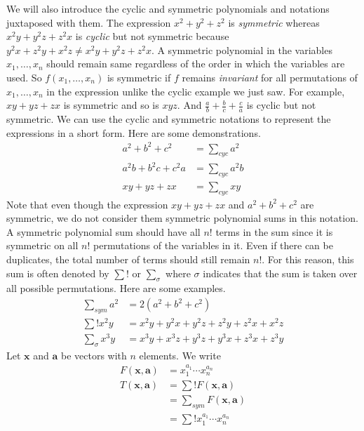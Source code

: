 \documentclass{subfile}
\begin{document}
	We will also introduce the cyclic and symmetric polynomials and notations juxtaposed with them. The expression $x^{2}+y^{2}+z^{2}$ is \textit{symmetric} whereas $x^{2}y+y^{2}z+z^{2}x$ is \textit{cyclic} but not symmetric because $y^{2}x+z^{2}y+x^{2}z\neq x^{2}y+y^{2}z+z^{2}x$. A symmetric polynomial in the variables $x_{1},\ldots,x_{n}$ should remain same regardless of the order in which the variables are used. So $f(x_{1},\ldots,x_{n})$ is symmetric if $f$ remains \textit{invariant} for all permutations of $x_{1},\ldots,x_{n}$ in the expression unlike the cyclic example we just saw. For example, $xy+yz+zx$ is symmetric and so is $xyz$. And $\frac{a}{b}+\frac{b}{c}+\frac{c}{a}$ is cyclic but not symmetric. We can use the cyclic and symmetric notations to represent the expressions in a short form. Here are some demonstrations.
		\begin{align*}
			a^{2}+b^{2}+c^{2}
				& = \sum_{cyc}a^{2}\\
			a^{2}b+b^{2}c+c^{2}a
				& = \sum_{cyc}a^{2}b\\
			xy+yz+zx
				& = \sum_{cyc}xy
		\end{align*}
	Note that even though the expression $xy+yz+zx$ and $a^{2}+b^{2}+c^{2}$ are symmetric, we do not consider them symmetric polynomial sums in this notation. A symmetric polynomial sum should have all $n!$ terms in the sum since it is symmetric on all $n!$ permutations of the variables in it. Even if there can be duplicates, the total number of terms should still remain $n!$. For this reason, this sum is often denoted by $\sum{!}$ or $\sum_{\sigma}$ where $\sigma$ indicates that the sum is taken over all possible permutations. Here are some examples.
		\begin{align*}
			\sum_{sym}a^{2}
				& = 2(a^{2}+b^{2}+c^{2})\\
			\sum{!} x^{2}y
				& = x^{2}y+y^{2}x+y^{2}z+z^{2}y+z^{2}x+x^{2}z\\
			\sum_{\sigma}x^{3}y
				& = x^{3}y+x^{3}z+y^{3}z+y^{3}x+z^{3}x+z^{3}y
		\end{align*}
	Let $\mathbf{x}$ and $\mathbf{a}$ be vectors with $n$ elements. We write
		\begin{align*}
			F(\mathbf{x}, \mathbf{a})
				& = x_{1}^{a_{1}}\cdots x_{n}^{a_{n}}\\
			T(\mathbf{x},\mathbf{a})
				& = \sum{!}F(\mathbf{x},\mathbf{a})\\
				& = \sum_{sym} F(\mathbf{x},\mathbf{a})\\
				& = \sum{!}x_{1}^{a_{1}}\cdots x_{n}^{a_{n}}
		\end{align*}
\end{document}

